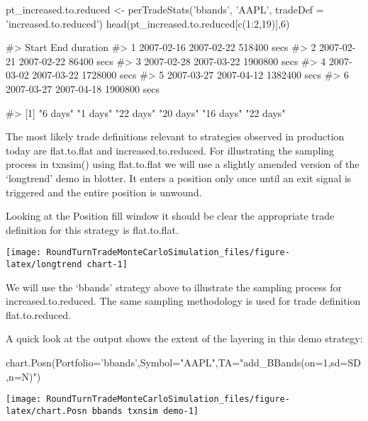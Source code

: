 \begin{Schunk}
\begin{Sinput}
pt_increased.to.reduced <- perTradeStats('bbands', 'AAPL', tradeDef = 'increased.to.reduced')
head(pt_increased.to.reduced[c(1:2,19)],6)
\end{Sinput}
\begin{Soutput}
#>        Start        End     duration
#> 1 2007-02-16 2007-02-22  518400 secs
#> 2 2007-02-21 2007-02-22   86400 secs
#> 3 2007-02-28 2007-03-22 1900800 secs
#> 4 2007-03-02 2007-03-22 1728000 secs
#> 5 2007-03-27 2007-04-12 1382400 secs
#> 6 2007-03-27 2007-04-18 1900800 secs
\end{Soutput}
\begin{Soutput}
#> [1] "6 days"  "1 days"  "22 days" "20 days" "16 days" "22 days"
\end{Soutput}
\end{Schunk}

The most likely trade definitions relevant to strategies observed in
production today are flat.to.flat and increased.to.reduced. For
illustrating the sampling process in txnsim() using flat.to.flat we will
use a slightly amended version of the `longtrend' demo in blotter. It
enters a position only once until an exit signal is triggered and the
entire position is unwound.

Looking at the Position fill window it should be clear the appropriate
trade definition for this strategy is flat.to.flat.

\begin{Schunk}


\begin{center}\texttt{[image: RoundTurnTradeMonteCarloSimulation\_files/figure-latex/longtrend chart-1]} \end{center}

\end{Schunk}

We will use the `bbands' strategy above to illustrate the sampling
process for increased.to.reduced. The same sampling methodology is used
for trade definition flat.to.reduced.

A quick look at the output shows the extent of the layering in this demo
strategy:

\begin{Schunk}
\begin{Sinput}
chart.Posn(Portfolio='bbands',Symbol="AAPL",TA="add_BBands(on=1,sd=SD,n=N)")
\end{Sinput}


\begin{center}\texttt{[image: RoundTurnTradeMonteCarloSimulation\_files/figure-latex/chart.Posn bbands txnsim demo-1]} \end{center}

\end{Schunk}

